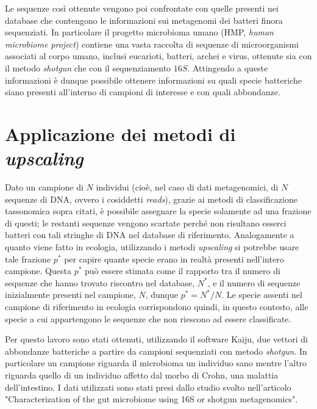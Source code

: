 Le sequenze così ottenute vengono poi confrontate con quelle presenti nei database che contengono le informazioni sui metagenomi dei batteri finora sequenziati. In particolare il progetto microbioma umano (HMP, \emph{human microbiome project}) contiene una vasta raccolta di sequenze di microorganismi associati al corpo umano, inclusi eucarioti, batteri, archei e virus, ottenute sia con il metodo \emph{shotgun} che con il sequenziamento $16S$. Attingendo a queste informazioni è dunque possibile ottenere informazioni su quali specie batteriche siano presenti all'interno di campioni di interesse e con quali abbondanze.



\section{Applicazione dei metodi di \emph{upscaling}}
Dato un campione di $N$ individui (cioè, nel caso di dati metagenomici, di $N$ sequenze di DNA, ovvero i cosiddetti \emph{reads}), grazie ai metodi di classificazione tassonomica sopra citati, è possibile assegnare la specie solamente ad una frazione di questi; le restanti sequenze vengono scartate perché non risultano esserci  batteri con tali stringhe di DNA nel database di riferimento. Analogamente a quanto viene fatto in ecologia, utilizzando i metodi \emph{upscaling} si potrebbe usare tale frazione $p^*$ per capire quante specie erano in realtà presenti nell'intero campione. Questa $p^*$ può essere stimata come il rapporto tra il numero di sequenze che hanno trovato riscontro nel database, $N^*$, e il numero di sequenze inizialmente presenti nel campione, $N$, dunque $p^*=N^*/N$.  Le specie assenti nel campione di riferimento in ecologia corrispondono quindi, in questo contesto, alle specie a cui appartengono le sequenze che non riescono ad essere classificate.

Per questo lavoro sono stati ottenuti, utilizzando il software Kaiju\cite{Kaiju}, due vettori di abbondanze batteriche a partire da campioni sequenziati con metodo \emph{shotgun}. In particolare un campione riguarda il microbioma un individuo sano mentre l'altro riguarda quello di un individuo affetto dal morbo di Crohn, una malattia dell'intestino. I dati utilizzati sono stati presi dallo studio svolto nell'articolo "Characterization of the gut microbiome using 16S or shotgun metagenomics"\cite{shotgun}. \\

